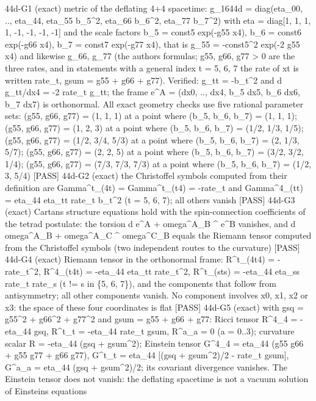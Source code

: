 \documentclass[
  10pt,
]{article}
\newenvironment{Shaded}{}{}
\newcommand{\NormalTok}[1]{#1}
\begin{document}
\begin{Shaded}
\begin{Highlighting}[]
\NormalTok{[PASS] 44d{-}G1  (exact) metric of the deflating 4+4 spacetime: g\_1644d = diag(eta\_00, .., eta\_44, eta\_55 b\_5\^{}2, eta\_66 b\_6\^{}2, eta\_77 b\_7\^{}2) with eta = diag[1, 1, 1, 1, {-}1, {-}1, {-}1, {-}1] and the scale factors b\_5 = const5 exp({-}g55 x4), b\_6 = const6 exp({-}g66 x4), b\_7 = const7 exp({-}g77 x4), that is g\_55 = {-}const5\^{}2 exp({-}2 g55 x4) and likewise g\_66, g\_77 (the author\textquotesingle{}s formulas; g55, g66, g77 \textgreater{} 0 are the three rates, and in statements with a general index t = 5, 6, 7 the rate of xt is written rate\_t, gsum = g55 + g66 + g77). Verified: g\_tt = {-}b\_t\^{}2 and d g\_tt/dx4 = {-}2 rate\_t g\_tt; the frame e\^{}A = (dx0, .., dx4, b\_5 dx5, b\_6 dx6, b\_7 dx7) is orthonormal. All exact geometry checks use five rational parameter sets: (g55, g66, g77) = (1, 1, 1) at a point where (b\_5, b\_6, b\_7) = (1, 1, 1); (g55, g66, g77) = (1, 2, 3) at a point where (b\_5, b\_6, b\_7) = (1/2, 1/3, 1/5); (g55, g66, g77) = (1/2, 3/4, 5/3) at a point where (b\_5, b\_6, b\_7) = (2, 1/3, 5/7); (g55, g66, g77) = (2, 2, 5) at a point where (b\_5, b\_6, b\_7) = (3/2, 3/2, 1/4); (g55, g66, g77) = (7/3, 7/3, 7/3) at a point where (b\_5, b\_6, b\_7) = (1/2, 3, 5/4)}
\NormalTok{[PASS] 44d{-}G2  (exact) the Christoffel symbols computed from their definition are Gamma\^{}t\_(4t) = Gamma\^{}t\_(t4) = {-}rate\_t and Gamma\^{}4\_(tt) = eta\_44 eta\_tt rate\_t b\_t\^{}2 (t = 5, 6, 7); all others vanish}
\NormalTok{[PASS] 44d{-}G3  (exact) Cartan\textquotesingle{}s structure equations hold with the spin{-}connection coefficients of the tetrad postulate: the torsion d e\^{}A + omega\^{}A\_B \^{} e\^{}B vanishes, and d omega\^{}A\_B + omega\^{}A\_C \^{} omega\^{}C\_B equals the Riemann tensor computed from the Christoffel symbols (two independent routes to the curvature)}
\NormalTok{[PASS] 44d{-}G4  (exact) Riemann tensor in the orthonormal frame: R\^{}t\_(4t4) = {-}rate\_t\^{}2, R\^{}4\_(t4t) = {-}eta\_44 eta\_tt rate\_t\^{}2, R\^{}t\_(sts) = {-}eta\_44 eta\_ss rate\_t rate\_s (t != s in \{5, 6, 7\}), and the components that follow from antisymmetry; all other components vanish. No component involves x0, x1, x2 or x3: the space of these four coordinates is flat}
\NormalTok{[PASS] 44d{-}G5  (exact) with gsq = g55\^{}2 + g66\^{}2 + g77\^{}2 and gsum = g55 + g66 + g77: Ricci tensor R\^{}4\_4 = {-}eta\_44 gsq, R\^{}t\_t = {-}eta\_44 rate\_t gsum, R\^{}a\_a = 0 (a = 0..3); curvature scalar R = {-}eta\_44 (gsq + gsum\^{}2); Einstein tensor G\^{}4\_4 = eta\_44 (g55 g66 + g55 g77 + g66 g77), G\^{}t\_t = eta\_44 [(gsq + gsum\^{}2)/2 {-} rate\_t gsum], G\^{}a\_a = eta\_44 (gsq + gsum\^{}2)/2; its covariant divergence vanishes. The Einstein tensor does not vanish: the deflating spacetime is not a vacuum solution of Einstein\textquotesingle{}s equations}

\end{Highlighting}
\end{Shaded}
\end{document}
